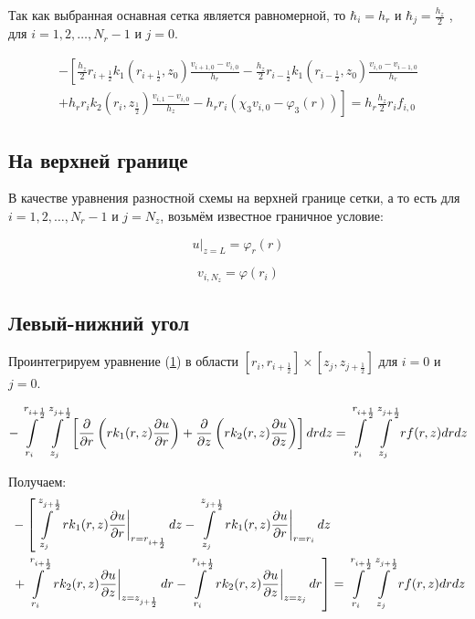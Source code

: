 Так как выбранная оснавная сетка является равномерной, то $ \hbar_i = h_r $ и $ \hbar_j = \frac{h_z}{2}$
, для $ i = 1,2, \dots, N_r-1 $ и $ j = 0 $.

\begin{align*}
  - \left [ 
  \frac{h_z}{2} r_{i+\frac{1}{2}} k_1(r_{i+\frac{1}{2}}, z_0) \frac{v_{i+1, 0} - v_{i, 0}}{h_{r}}
  - \frac{h_z}{2} r_{i-\frac{1}{2}} k_1(r_{i-\frac{1}{2}}, z_0) \frac{v_{i, 0} - v_{i - 1, 0}}{h_{r}}
  \right . \\
  \left .
  + h_r r_{i} k_2(r_i, z_{\frac{1}{2}}) \frac{v_{i, 1} - v_{i, 0}}{h_{z}}
  - h_r r_i (\chi_3 v_{i, 0} - \varphi_3(r))
  \right ]  = h_r \frac{h_z}{2} r_i f_{i, 0}
\end{align*}

\subsection{На верхней границе}
В качестве уравнения разностной схемы на верхней границе сетки,
а то есть для $ i = 1, 2, \dots, N_r - 1 $ и $ j = N_z $, возьмём известное граничное условие:

\[
  \left . u \right \vert_{z=L} = \varphi_r(r) 
\]

\[
  v_{i,N_z} = \varphi(r_i)
\]

\subsection{Левый-нижний угол}

Проинтегрируем уравнение (\hyperref[eq1]{1}) в области
$ [r_{i}, r_{i +\frac{1}{2}}] \times  [z_{j}, z_{j +\frac{1}{2}}] $
для $ i = 0 $ и $ j = 0$.

\[
  - \int\limits^{r_{i +\frac{1}{2}}}_{r_{i }} \int\limits^{z_{j +\frac{1}{2}}}_{z_{j }} \left [ \pdv{}{r} \left ( r k_1(r, z) \pdv{u}{r} \right ) 
  + \pdv{}{z} \left ( rk_2(r, z)\pdv{u}{z} \right ) \right ] dr dz = \int\limits^{r_{i +\frac{1}{2}}}_{r_{i }} \int\limits^{z_{j +\frac{1}{2}}}_{z_{j }} rf(r, z) dr dz
\]

Получаем:
\begin{align*}
  &- \left [
   \int\limits^{z_{j +\frac{1}{2}}}_{z_{j }}  \left . r k_1(r, z) \pdv{u}{r} \right \vert_{r = r_{i + \frac{1}{2}}} dz
  - \int\limits^{z_{j +\frac{1}{2}}}_{z_{j }} \left . r k_1(r, z) \pdv{u}{r} \right \vert_{r = r_{i}} dz
  \right . \\
  &\left . + \int\limits^{r_{i+\frac{1}{2}}}_{r_{i}} \left . rk_2(r, z)\pdv{u}{z} \right \vert_{z = z_{j + \frac{1}{2}}} dr
  - \int\limits^{r_{i+\frac{1}{2}}}_{r_{i}} \left . rk_2(r, z)\pdv{u}{z} \right \vert_{z = z_{j}} dr
  \right ] = \int\limits^{r_{i +\frac{1}{2}}}_{r_{i }} \int\limits^{z_{j +\frac{1}{2}}}_{z_{j }} rf(r, z) dr dz
\end{align*}

